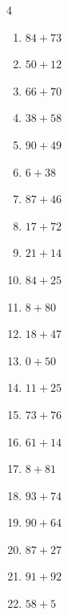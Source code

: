 \begin{multicols}{4}
\begin{enumerate}
  \item $84+73$
        \phantom{$=157$}

  \item $50+12$
        \phantom{$=62$}

  \item $66+70$
        \phantom{$=136$}

  \item $38+58$
        \phantom{$=96$}

  \item $90+49$
        \phantom{$=139$}

  \item $6+38$
        \phantom{$=44$}

  \item $87+46$
        \phantom{$=133$}

  \item $17+72$
        \phantom{$=89$}

  \item $21+14$
        \phantom{$=35$}

  \item $84+25$
        \phantom{$=109$}

  \item $8+80$
        \phantom{$=88$}

  \item $18+47$
        \phantom{$=65$}

  \item $0+50$
        \phantom{$=50$}

  \item $11+25$
        \phantom{$=36$}

  \item $73+76$
        \phantom{$=149$}

  \item $61+14$
        \phantom{$=75$}

  \item $8+81$
        \phantom{$=89$}

  \item $93+74$
        \phantom{$=167$}

  \item $90+64$
        \phantom{$=154$}

  \item $87+27$
        \phantom{$=114$}

  \item $91+92$
        \phantom{$=183$}

  \item $58+5$
        \phantom{$=63$}


\end{enumerate}
\end{multicols}
